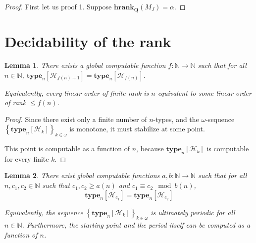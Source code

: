 \documentclass{article}
\newtheorem{lemma}{Lemma}
\newcommand{\brackets}[1]{\left[ {#1} \right]}
\newcommand{\braces}[1]{\left\{ {#1} \right\}}
\newcommand{\hrank}[1]{\mathbf{hrank}_{\qq}\left( #1 \right)}
\newcommand{\qq}{\mathbf{Q}}
\newcommand{\NN}{\mathbb{N}}
\newcommand{\type}[2]{\mathbf{type}_{#1} \brackets{#2}}
\begin{document}
\begin{proof}
  First let us proof 1. Suppose $\hrank{M_J} = \alpha$.
  
  
\end{proof}

\section{Decidability of the rank}



\begin{lemma}
  There exists a global computable function $f : \NN \to \NN$ such that
  for all $n \in \NN$,
  $\type{n}{\mathcal{H}_{f(n) + 1}} = \type{n}{\mathcal{H}_{f(n)}}$.

  Equivalently, every linear order of finite rank is $n$-equivalent to some linear order of rank $\le f(n)$.
\end{lemma}

\begin{proof}
  Since there exist only a finite number of $n$-types,
  and the $\omega$-sequence $\braces{\type{n}{\mathcal{H}_{k}}}_{k \in \omega}$ is monotone,
  it must stabilize at some point.

  This point is computable as a function of $n$, because
  $\type{n}{\mathcal{H}_{k}}$ is computable for every finite $k$.
\end{proof}

\begin{lemma}
  There exist global computable functions $a, b : \NN \to \NN$ such that
  for all $n, c_1, c_2 \in \NN$ such that $c_1, c_2 \ge a(n)$ and $c_1 \equiv c_2 \mod b(n)$,
  $$\type{n}{\mathcal{H}_{c_1}} = \type{n}{\mathcal{H}_{c_2}}$$

  Equivalently, the sequence $\braces{\type{n}{\mathcal{H}_{k}}}_{k \in \omega}$
  is ultimately periodic for all $n \in \NN$. Furthermore, the starting point and the period
  itself can be computed as a function of $n$.
\end{lemma}
\end{document}

